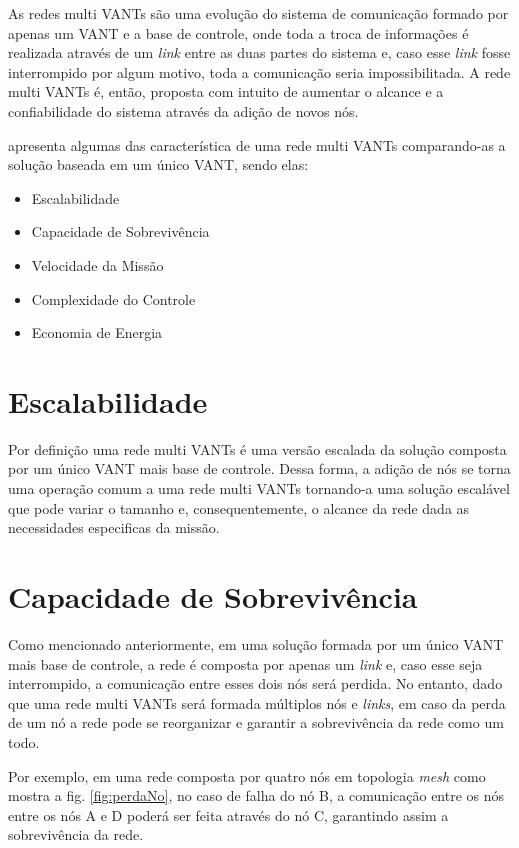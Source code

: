 \label{Cap:Requisitos}

As redes multi VANTs são uma evolução do sistema de comunicação formado por apenas um VANT e a base de controle, onde toda a troca de informações é realizada através de um \emph{link} entre as duas partes do sistema e, caso esse \emph{link} fosse interrompido por algum motivo, toda a comunicação seria impossibilitada. A rede multi VANTs é, então, proposta com intuito de aumentar o alcance e a confiabilidade do sistema através da adição de novos nós.

\cite{gupta2015survey} apresenta algumas das característica de uma rede multi VANTs comparando-as a solução baseada em um único VANT, sendo elas:
\begin{itemize}
\item Escalabilidade
\item Capacidade de Sobrevivência
\item Velocidade da Missão
\item Complexidade do Controle
\item Economia de Energia
\end{itemize} 

\section{Escalabilidade}

Por definição uma rede multi VANTs é uma versão escalada da solução composta por um único VANT mais base de controle. Dessa forma, a adição de nós se torna uma operação comum a uma rede multi VANTs tornando-a uma solução escalável que pode variar o tamanho e, consequentemente, o alcance da rede dada as necessidades especificas da missão.

\section{Capacidade de Sobrevivência}

Como mencionado anteriormente, em uma solução formada por um único VANT mais base de controle, a rede é composta por apenas um \emph{link} e, caso esse seja interrompido, a comunicação entre esses dois nós será perdida. No entanto, dado que uma rede multi VANTs será formada múltiplos nós e \emph{links}, em caso da perda de um nó a rede pode se reorganizar e garantir a sobrevivência da rede como um todo. 

Por exemplo, em uma rede composta por quatro nós em topologia \emph{mesh} como mostra a fig. \ref{fig:perdaNo}, no caso de falha do nó B, a comunicação entre os nós entre os nós A e D poderá ser feita através do nó C, garantindo assim a sobrevivência da rede. 

